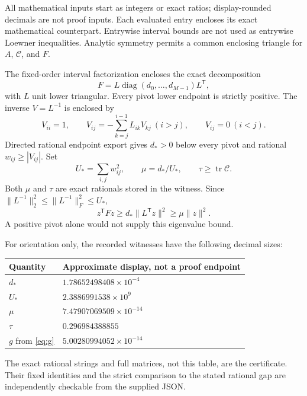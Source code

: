 \documentclass[11pt]{article}
\newcommand{\norm}[1]{\lVert#1\rVert}
\begin{document}
All mathematical inputs start as integers or exact ratios; display-rounded decimals are not proof inputs. Each evaluated entry encloses its exact mathematical counterpart. Entrywise interval bounds are not used as entrywise Loewner inequalities. Analytic symmetry permits a common enclosing triangle for $A$, $\mathcal C$, and $F$.

The fixed-order interval factorization encloses the exact decomposition
\[
 F=L\operatorname{diag}(d_0,\ldots,d_{M-1})L^{\mathsf T},
\]
with $L$ unit lower triangular. Every pivot lower endpoint is strictly positive. The inverse $V=L^{-1}$ is enclosed by
\[
 V_{ii}=1,\qquad V_{ij}=-\sum_{k=j}^{i-1}L_{ik}V_{kj}\ (i>j),\qquad V_{ij}=0\ (i<j).
\]
Directed rational endpoint export gives $d_*>0$ below every pivot and rational $w_{ij}\ge|V_{ij}|$. Set
\[
 U_* =\sum_{i,j}w_{ij}^2,\qquad \mu=d_*/U_*,\qquad
 \tau\ge\operatorname{tr}\mathcal C.
\]
Both $\mu$ and $\tau$ are exact rationals stored in the witness. Since $\norm{L^{-1}}_2^2\le\norm{L^{-1}}_F^2\le U_*$,
\[
 z^{\mathsf T}Fz\ge d_*\norm{L^{\mathsf T}z}^2\ge\mu\norm z^2.
\]
A positive pivot alone would not supply this eigenvalue bound.

For orientation only, the recorded witnesses have the following decimal sizes:
\begin{center}
\begin{tabular}{ll}\toprule
Quantity & Approximate display, not a proof endpoint\\\midrule
$d_*$ & $1.78652498408\times10^{-4}$\\
$U_*$ & $2.3886991538\times10^9$\\
$\mu$ & $7.47907069509\times10^{-14}$\\
$\tau$ & $0.296984388855$\\
$g$ from \eqref{eq:g} & $5.00280994052\times10^{-14}$\\\bottomrule
\end{tabular}
\end{center}
The exact rational strings and full matrices, not this table, are the certificate. Their fixed identities and the strict comparison to the stated rational gap are independently checkable from the supplied JSON.
\end{document}
